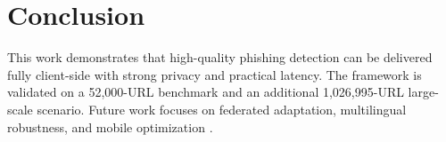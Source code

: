 \documentclass[conference]{IEEEtran}
\begin{document}
\section{Conclusion}
This work demonstrates that high-quality phishing detection can be delivered fully client-side with strong privacy and practical latency. The framework is validated on a 52,000-URL benchmark and an additional 1,026,995-URL large-scale scenario. Future work focuses on federated adaptation, multilingual robustness, and mobile optimization \cite{b2,b53,b55}.

\balance

\end{document}
